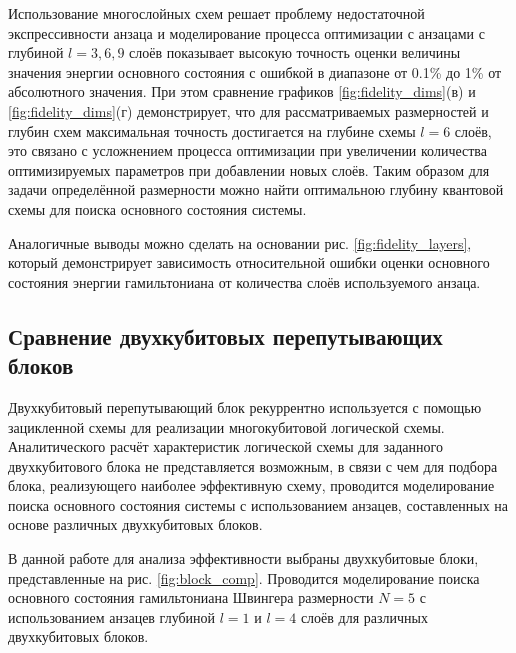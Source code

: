 \documentclass[14pt]{extarticle}
\begin{document}
\qquad Использование многослойных схем решает проблему недостаточной экспрессивности анзаца и моделирование процесса оптимизации с анзацами с глубиной $l=3,6,9$ слоёв показывает высокую точность оценки величины значения энергии основного состояния с ошибкой в диапазоне от 0.1\% до 1\% от абсолютного значения. При этом сравнение графиков \ref{fig:fidelity_dims}(в) и \ref{fig:fidelity_dims}(г) демонстрирует, что для рассматриваемых размерностей и глубин схем максимальная точность достигается на глубине схемы  $l=6$ слоёв, это связано с усложнением процесса оптимизации при увеличении количества оптимизируемых параметров при добавлении новых слоёв. Таким образом для задачи определённой размерности можно найти оптимальною глубину квантовой схемы для поиска основного состояния системы.

\qquad Аналогичные выводы можно сделать на основании рис. \ref{fig:fidelity_layers}, который демонстрирует зависимость относительной ошибки оценки основного состояния энергии гамильтониана от количества слоёв используемого анзаца.

\subsection[Сравнение двухкубитовых перепутывающих блоков]{Сравнение двухкубитовых перепутывающих \linebreak блоков}

\qquad Двухкубитовый перепутывающий блок рекуррентно используется с помощью зацикленной схемы для реализации многокубитовой логической схемы. Аналитического расчёт характеристик логической схемы для заданного двухкубитового блока не представляется возможным, в связи с чем для подбора блока, реализующего наиболее эффективную схему, проводится моделирование поиска основного состояния системы с использованием анзацев, составленных на основе различных двухкубитовых блоков.

\qquad В данной работе для анализа эффективности выбраны двухкубитовые блоки, представленные на рис. \ref{fig:block_comp}. Проводится моделирование поиска основного состояния гамильтониана Швингера размерности $N = 5$ с использованием анзацев глубиной $l = 1$ и $l = 4$ слоёв для различных двухкубитовых блоков.
\end{document}
